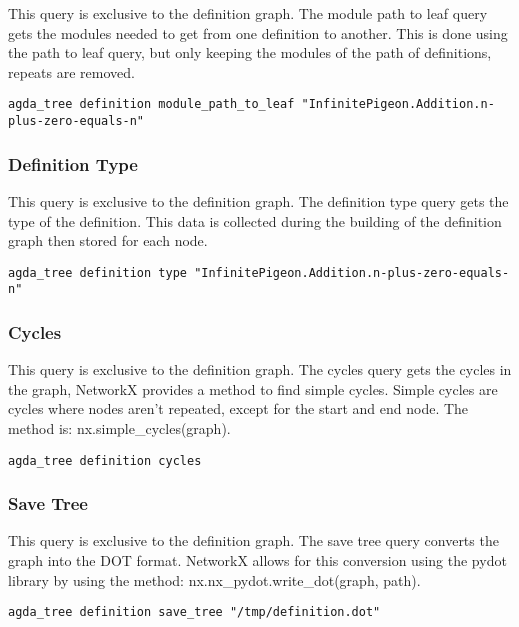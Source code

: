 This query is exclusive to the definition graph. The module path to leaf query
gets the modules needed to get from one definition to another. This is done
using the path to leaf query, but only keeping the modules of the path of
definitions, repeats are removed.

\begin{lstlisting}
agda_tree definition module_path_to_leaf "InfinitePigeon.Addition.n-plus-zero-equals-n"
\end{lstlisting}

\subsubsection{Definition Type}

This query is exclusive to the definition graph. The definition type query gets
the type of the definition. This data is collected during the building of the
definition graph then stored for each node.

\begin{lstlisting}
agda_tree definition type "InfinitePigeon.Addition.n-plus-zero-equals-n"
\end{lstlisting}

\subsubsection{Cycles}

This query is exclusive to the definition graph. The cycles query gets the
cycles in the graph, NetworkX provides a method to find simple cycles. Simple
cycles are cycles where nodes aren't repeated, except for the start and end
node. The method is: \textsf{nx.simple\_cycles(graph)}.

\begin{lstlisting}
agda_tree definition cycles
\end{lstlisting}

\subsubsection{Save Tree}

This query is exclusive to the definition graph. The save tree query converts
the graph into the DOT format. NetworkX allows for this conversion using the
pydot library by using the method: \textsf{nx.nx\_pydot.write\_dot(graph, path)}.

\begin{lstlisting}
agda_tree definition save_tree "/tmp/definition.dot"
\end{lstlisting}


